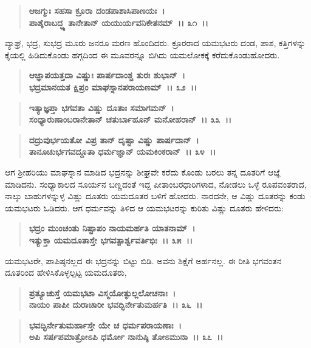 \begin{verse}
\textbf{ಆಜಗ್ಮುಃ ಸಹಸಾ ಕ್ರೂರಾ ದಂಡಪಾಶಾಸಿಪಾಣಯಃ~।}\\\textbf{ಪಾಶೈರಾಬದ್ಧ್ಯ ತಾನೇತಾನ್ ಯಯುರ್ಯವನಿಕೇತನಮ್~।। ೩೧~।।}
\end{verse}

ವ್ಯಾಘ್ರ, ಭದ್ರ, ಸುಭದ್ರ ಮೂರು ಜನರೂ ಮರಣ ಹೊಂದಿದರು. ಕ್ರೂರರಾದ ಯಮಭಟರು ದಂಡ, ಪಾಶ, ಕತ್ತಿಗಳನ್ನು ಕೈಯಲ್ಲಿ ಹಿಡಿದುಕೊಂಡು ಹಗ್ಗದಿಂದ ಈ ಮೂವರನ್ನೂ ಬಿಗಿದು ಯಮಲೋಕಕ್ಕೆ ಕರೆದುಕೊಂಡುಹೋದರು.

\begin{verse}
\textbf{ಆಜ್ಞಾಪಯತ್ತದಾ ವಿಷ್ಣುಃ ಪಾರ್ಷದಾಂಶ್ಚ ತುರಃ ಶುಭಾನ್~।}\\\textbf{ಭದ್ರಮಾನಯತ ಕ್ಷಿಪ್ರಂ ಮಾಘಸ್ನಾನಪರಾಯಣಮ್~।। ೩೨~।।} 
\end{verse}

\begin{verse}
\textbf{ಇತ್ಯಾಜ್ಞಪ್ತಾ ಭಗವತಾ ವಿಷ್ಣು ದೂತಾಃ ಸಮಾಗಮನ್~।}\\\textbf{ಸಂಧ್ಯಾರುಣಾಂಬರಾನೇತಾನ್ ಚತುರ್ಬಾಹೂನ್ ಮನೋಹರಾನ್~।। ೩೩~।। }
\end{verse}

\begin{verse}
\textbf{ದದ್ರುವುರ್ಭಯತೋ ವಿಪ್ರ ತಾನ್ ದೃಷ್ಟಾ ವಿಷ್ಣು ಪಾರ್ಷದಾನ್~।}\\\textbf{ತಾನೂಚುರ್ಭಗವದ್ದೂತಾ ಧರ್ಮಜ್ಞಾನ್ ಯಮಕಿಂಕರಾನ್~।। ೩೪~।।}
\end{verse}

ಆಗ ಶ‍್ರೀಹರಿಯು ಮಾಘಸ್ನಾನ ಮಾಡಿದ ಭದ್ರನನ್ನು ಶೀಘ್ರವೇ ಕರೆದು ಕೊಂಡು ಬರಲು ತನ್ನ ದೂತರಿಗೆ ಆಜ್ಞೆ ಮಾಡಿದನು. ಸಂಧ್ಯಾಕಾಲದ ಸೂರ್ಯನ ಬಣ್ಣದಂತೆ ಇದ್ದ ಪೀತಾಂಬರಧಾರಿಗಳಾದ, ನೋಡಲು ಒಳ್ಳೆ ರೂಪವಂತರಾದ, ನಾಲ್ಕು ಬಾಹುಗಳನ್ನುಳ್ಳ ವಿಷ್ಣು ದೂತರು ಯಮದೂತರ ಬಳಿಗೆ ಹೋದರು. ನಾರದನೇ, ಆ ವಿಷ್ಣು ದೂತರನ್ನು ಕಂಡು ಯಮಭಟರು ಓಡಿದರು. ಆಗ ಧರ್ಮವನ್ನು ತಿಳಿದ ಆ ಯಮಭಟರನ್ನು ಕುರಿತು ವಿಷ್ಣು ದೂತರು ಹೇಳಿದರು:

\begin{verse}
\textbf{ಭದ್ರಂ ಮುಂಚಂತು ನಿಷ್ಟಾಪಂ ನಾಯಮರ್ಹತಿ ಯಾತನಾಮ್~।}\\\textbf{ಇತ್ಯುಕ್ತಾ ಯಮದೂತಾಸ್ತೇ ಭಗವತ್ಪಾರ್ಶ್ವವರ್ತಿಭಿಃ~।। ೩೫~।।}
\end{verse}

ಯಮಭಟರೇ, ಪಾಪಿಷ್ಠನಲ್ಲದ ಈ ಭದ್ರನನ್ನು ಬಿಟ್ಟು ಬಿಡಿ. ಅವನು ಶಿಕ್ಷೆಗೆ ಅರ್ಹನಲ್ಲ. ಈ ರೀತಿ ಭಗವಂತನ ದೂತರಿಂದ ಹೇಳಿಸಿಕೊಳ್ಳಲ್ಪಟ್ಟ ಯಮದೂತರು,

\begin{verse}
\textbf{ಪ್ರತ್ಯೂಚುಸ್ತೆ ಯಮಭಟಾ ವಿಸ್ಮಯೋತ್ಫುಲ್ಲಲೋಚನಾಃ~।}\\\textbf{ನಾಯಂ ಪಾಪೀ ದುರಾಚಾರೀ ಭವದ್ಭಿರ್ನೇತುಮರ್ಹತಿ~।। ೩೬~।। }
\end{verse}

\begin{verse}
\textbf{ಭವದ್ಭಿರ್ನೇತುಮರ್ಹಾಸ್ತೇ ಯೇ ಚ ಧರ್ಮಪರಾಯಣಾಃ~।}\\\textbf{ಅಪಿ ಸರ್ಷಪಮಾತ್ರೋಽಪಿ ಧರ್ಮೋ ನಾನುಷ್ಠಿ ತೋಽಮುನಾ~।। ೩೭~।।}
\end{verse}

